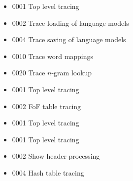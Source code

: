 \begin{itemize}


\item 0001       Top level tracing


\item 0002       Trace loading of language models


\item 0004       Trace saving of language models


\item 0010       Trace word mappings


\item 0020       Trace $n$-gram lookup


\end{itemize}







\begin{itemize}


\item 0001       Top level tracing


\item 0002       FoF table tracing


\end{itemize}







\begin{itemize}


\item 0001       Top level tracing


\end{itemize}







\begin{itemize}


\item 0001       Top level tracing


\item 0002       Show header processing


\item 0004       Hash table tracing


\end{itemize}





